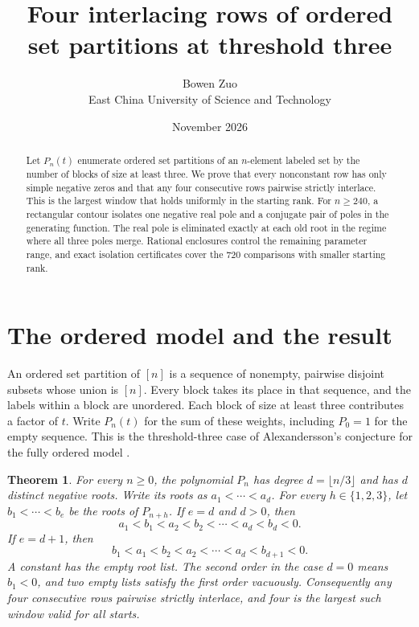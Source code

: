 \documentclass[11pt]{article}
\title{Four interlacing rows of ordered set partitions at threshold three}
\author{Bowen Zuo\\[2pt]\small East China University of Science and Technology}
\date{November 2026}
\newtheorem{theorem}{Theorem}
\begin{document}
\maketitle

\begin{abstract}
Let \(P_n(t)\) enumerate ordered set partitions of an \(n\)-element
labeled set by the number of blocks of size at least three. We prove
that every nonconstant row has only simple negative zeros and that
any four consecutive rows pairwise strictly interlace. This is the
largest window that holds uniformly in the starting rank. For
\(n\ge240\), a rectangular contour isolates one negative real pole
and a conjugate pair of poles in the generating function. The real
pole is eliminated exactly at each old root in the regime where all
three poles merge. Rational enclosures control the remaining
parameter range, and exact isolation certificates cover the 720
comparisons with smaller starting rank.
\end{abstract}

\section{The ordered model and the result}

An ordered set partition of \([n]\) is a sequence of nonempty,
pairwise disjoint subsets whose union is \([n]\). Every block takes
its place in that sequence, and the labels within a block are
unordered. Each block of size at least three contributes a factor
of \(t\). Write \(P_n(t)\) for the sum of these weights, including
\(P_0=1\) for the empty sequence. This is the threshold-three case
of Alexandersson's conjecture for the fully ordered model
\cite{symcat,realrooted}.

\begin{theorem}\label{thm:main}
For every \(n\ge0\), the polynomial \(P_n\) has degree
\(d=\lfloor n/3\rfloor\) and has \(d\) distinct negative roots. Write its
roots as \(a_1<\cdots<a_d\). For every \(h\in\{1,2,3\}\), let
\(b_1<\cdots<b_e\) be the roots of \(P_{n+h}\).
If \(e=d\) and \(d>0\), then
\[
 a_1<b_1<a_2<b_2<\cdots<a_d<b_d<0.
\]
If \(e=d+1\), then
\[
 b_1<a_1<b_2<a_2<\cdots<a_d<b_{d+1}<0.
\]
A constant has the empty root list. The second order in the case
\(d=0\) means \(b_1<0\), and two empty lists satisfy the first order
vacuously. Consequently any four consecutive rows pairwise strictly
interlace, and four is the largest such window valid for all starts.
\end{theorem}
\end{document}
